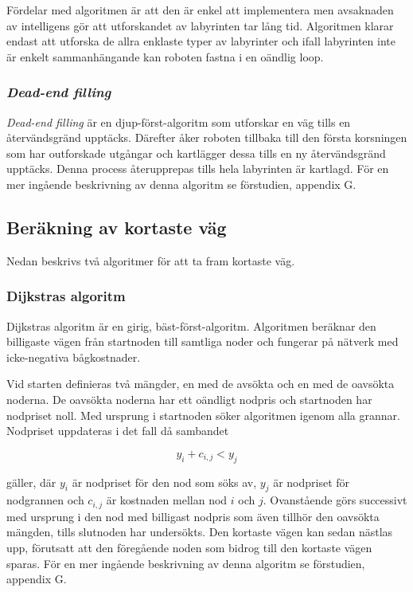 \documentclass[11pt]{article}
\begin{document}
\begin{flushleft}
Fördelar med algoritmen är att den är enkel att implementera men avsaknaden av intelligens gör att utforskandet av labyrinten tar lång tid. Algoritmen klarar endast att utforska de allra enklaste typer av labyrinter och ifall labyrinten inte är enkelt sammanhängande kan roboten fastna i en oändlig loop.

\subsubsection{\emph{Dead-end filling}}
\emph{Dead-end filling} är en djup-först-algoritm som utforskar en väg tills en återvändsgränd upptäcks. Därefter åker roboten tillbaka till den första korsningen som har outforskade utgångar och kartlägger dessa tills en ny återvändsgränd upptäcks. Denna process återupprepas tills hela labyrinten är kartlagd. För en mer ingående beskrivning av denna algoritm se förstudien, appendix G.

\subsection{Beräkning av kortaste väg}
Nedan beskrivs två algoritmer för att ta fram kortaste väg.

\subsubsection{Dijkstras algoritm}
Dijkstras algoritm är en girig, bäst-först-algoritm. Algoritmen beräknar den billigaste vägen från startnoden till samtliga noder och fungerar på nätverk med icke-negativa bågkostnader. 

Vid starten definieras två mängder, en med de avsökta och en med de oavsökta noderna. De oavsökta noderna har ett oändligt nodpris och startnoden har nodpriset noll. Med ursprung i startnoden söker algoritmen igenom alla grannar. Nodpriset uppdateras i det fall då sambandet

\begin{displaymath}
	y_i + c_{i,j} < y_j
\end{displaymath}

gäller, där \begin{math} y_i \end{math} är nodpriset för den nod som söks av, \begin{math} y_j \end{math} är nodpriset för nodgrannen och \begin{math} c_{i,j} \end{math} är kostnaden mellan nod \begin{math} i \end{math} och \begin{math} j \end{math}. Ovanstående görs successivt med ursprung i den nod med billigast nodpris som även tillhör den oavsökta mängden, tills slutnoden har undersökts. Den kortaste vägen kan sedan nästlas upp, förutsatt att den föregående noden som bidrog till den kortaste vägen sparas. För en mer ingående beskrivning av denna algoritm se förstudien, appendix G.


\end{flushleft}
\end{document}
